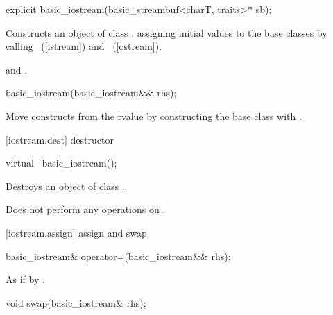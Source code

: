 %
\begin{itemdecl}
explicit basic_iostream(basic_streambuf<charT, traits>* sb);
\end{itemdecl}

\begin{itemdescr}
\pnum
\effects
Constructs an object of class
,
assigning initial values to the base classes by calling
~(\ref{istream})
and
~(\ref{ostream}).

\pnum
\postconditions
{}
and
.
\end{itemdescr}

%
\begin{itemdecl}
basic_iostream(basic_iostream&& rhs);
\end{itemdecl}

\begin{itemdescr}
\pnum
\effects Move constructs from the rvalue  by
constructing the  base class with
.
\end{itemdescr}

[iostream.dest]{ destructor}

%
\begin{itemdecl}
virtual ~basic_iostream();
\end{itemdecl}

\begin{itemdescr}
\pnum
\effects
Destroys an object of class
.

\pnum
\remarks
Does not perform any operations on
.
\end{itemdescr}

[iostream.assign]{ assign and swap}

%
\begin{itemdecl}
basic_iostream& operator=(basic_iostream&& rhs);
\end{itemdecl}

\begin{itemdescr}
\pnum
\effects As if by .
\end{itemdescr}

%
\begin{itemdecl}
void swap(basic_iostream& rhs);
\end{itemdecl}

